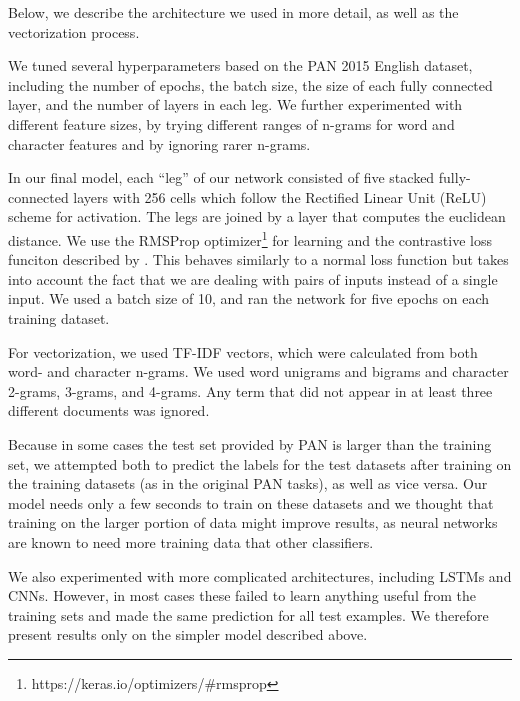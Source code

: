 Below, we describe the architecture we used in more detail, as well as the vectorization process.

We tuned several hyperparameters based on the PAN 2015 English dataset, including the number of epochs, the batch size, the size of each fully connected layer, and the number of layers in each leg. We further experimented with different feature sizes, by trying different ranges of n-grams for word and character features and by ignoring rarer n-grams.

In our final model, each ``leg'' of our network consisted of five stacked fully-connected layers with 256 cells which follow the Rectified Linear Unit (ReLU) scheme for activation. The legs are joined by a layer that computes the euclidean distance. We use the RMSProp optimizer\footnote{https://keras.io/optimizers/\#rmsprop} for learning and the contrastive loss funciton described by \citet{hadsell2006dimensionality}. This behaves similarly to a normal loss function but takes into account the fact that we are dealing with pairs of inputs instead of a single input. We used a batch size of 10, and ran the network for five epochs on each training dataset.

For vectorization, we used TF-IDF vectors, which were calculated from both word- and character n-grams. We used word unigrams and bigrams and character 2-grams, 3-grams, and 4-grams. Any term that did not appear in at least three different documents was ignored.

Because in some cases the test set provided by PAN is larger than the training set, we attempted both to predict the labels for the test datasets after training on the training datasets (as in the original PAN tasks), as well as vice versa. Our model needs only a few seconds to train on these datasets and we thought that training on the larger portion of data might improve results, as neural networks are known to need more training data that other classifiers. 

We also experimented with more complicated architectures, including LSTMs and CNNs. However, in most cases these failed to learn anything useful from the training sets and made the same prediction for all test examples. We therefore present results only on the simpler model described above.

